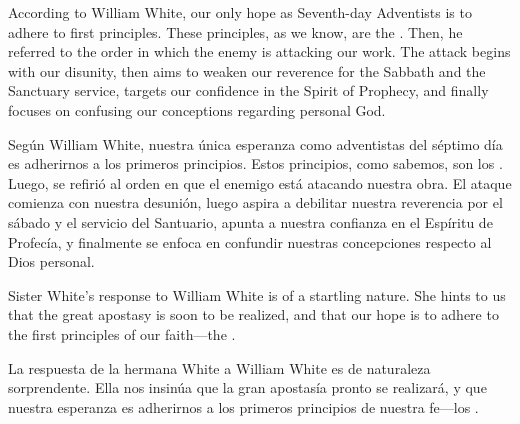 According to William White, our only hope as Seventh-day Adventists is to adhere to first principles. These principles, as we know, are the . Then, he referred to the order in which the enemy is attacking our work. The attack begins with our disunity, then aims to weaken our reverence for the Sabbath and the Sanctuary service, targets our confidence in the Spirit of Prophecy, and finally focuses on confusing our conceptions regarding personal God.


Según William White, nuestra única esperanza como adventistas del séptimo día es adherirnos a los primeros principios. Estos principios, como sabemos, son los . Luego, se refirió al orden en que el enemigo está atacando nuestra obra. El ataque comienza con nuestra desunión, luego aspira a debilitar nuestra reverencia por el sábado y el servicio del Santuario, apunta a nuestra confianza en el Espíritu de Profecía, y finalmente se enfoca en confundir nuestras concepciones respecto al Dios personal.


Sister White’s response to William White is of a startling nature. She hints to us that the great apostasy is soon to be realized, and that our hope is to adhere to the first principles of our faith—the .


La respuesta de la hermana White a William White es de naturaleza sorprendente. Ella nos insinúa que la gran apostasía pronto se realizará, y que nuestra esperanza es adherirnos a los primeros principios de nuestra fe—los .


 \\
 \\
 \\


 \\
 \\
 \\






